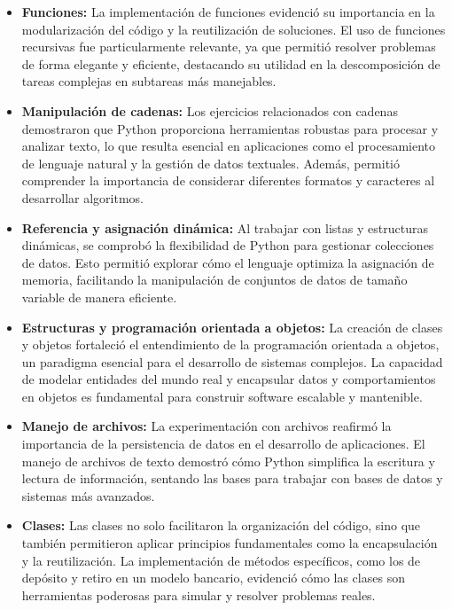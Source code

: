 \documentclass[conference]{IEEEtran}
\begin{document}
\begin{itemize}

    \item \textbf{Funciones:}  
    La implementación de funciones evidenció su importancia en la modularización del código y la reutilización de soluciones. El uso de funciones recursivas fue particularmente relevante, ya que permitió resolver problemas de forma elegante y eficiente, destacando su utilidad en la descomposición de tareas complejas en subtareas más manejables.

    \item \textbf{Manipulación de cadenas:}  
    Los ejercicios relacionados con cadenas demostraron que Python proporciona herramientas robustas para procesar y analizar texto, lo que resulta esencial en aplicaciones como el procesamiento de lenguaje natural y la gestión de datos textuales. Además, permitió comprender la importancia de considerar diferentes formatos y caracteres al desarrollar algoritmos.

    \item \textbf{Referencia y asignación dinámica:}  
    Al trabajar con listas y estructuras dinámicas, se comprobó la flexibilidad de Python para gestionar colecciones de datos. Esto permitió explorar cómo el lenguaje optimiza la asignación de memoria, facilitando la manipulación de conjuntos de datos de tamaño variable de manera eficiente.

    \item \textbf{Estructuras y programación orientada a objetos:}  
    La creación de clases y objetos fortaleció el entendimiento de la programación orientada a objetos, un paradigma esencial para el desarrollo de sistemas complejos. La capacidad de modelar entidades del mundo real y encapsular datos y comportamientos en objetos es fundamental para construir software escalable y mantenible.

    \item \textbf{Manejo de archivos:}  
    La experimentación con archivos reafirmó la importancia de la persistencia de datos en el desarrollo de aplicaciones. El manejo de archivos de texto demostró cómo Python simplifica la escritura y lectura de información, sentando las bases para trabajar con bases de datos y sistemas más avanzados.

    \item \textbf{Clases:}  
    Las clases no solo facilitaron la organización del código, sino que también permitieron aplicar principios fundamentales como la encapsulación y la reutilización. La implementación de métodos específicos, como los de depósito y retiro en un modelo bancario, evidenció cómo las clases son herramientas poderosas para simular y resolver problemas reales.

\end{itemize}
\end{document}
